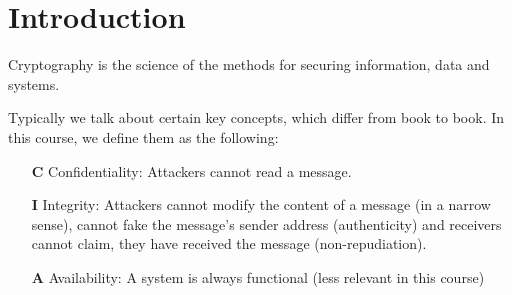 \chapter{Introduction}

Cryptography is the science of the methods for securing information, data and systems.

Typically we talk about certain key concepts, which differ from book to book. In this course, we define them as the following:

\begin{enumerate}
    \item[\textbf{C}] Confidentiality: Attackers cannot read a message.
    \item[\textbf{I}] Integrity: Attackers cannot modify the content of a message (in a narrow sense), cannot fake the message's sender address (authenticity) and receivers cannot claim, they have received the message (non-repudiation).
    \item[\textbf{A}] Availability: A system is always functional (less relevant in this course)
\end{enumerate}

